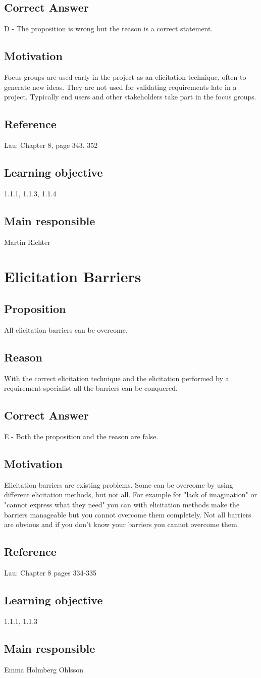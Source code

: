 \documentclass[a4paper]{article}
\begin{document}
\subsection*{Correct Answer}
D - The proposition is wrong but the reason is a correct statement.
\subsection*{Motivation}
Focus groups are used early in the project as an elicitation technique, often to generate new ideas. They are not used for validating requirements late in a project. Typically end users and other stakeholders take part in the focus groups.
\subsection*{Reference}
Lau: Chapter 8, page 343, 352
\subsection*{Learning objective}
1.1.1, 1.1.3, 1.1.4
\subsection*{Main responsible}
Martin Richter


\section{Elicitation Barriers}
\subsection*{Proposition}
All elicitation barriers can be overcome.
\subsection*{Reason}
With the correct elicitation technique and the elicitation performed by a requirement specialist all the barriers can be conquered.
\subsection*{Correct Answer}
E - Both the proposition and the reason are false.
\subsection*{Motivation}
Elicitation barriers are existing problems. Some can be overcome by using different elicitation methods, but not all. For example for "lack of imagination" or "cannot express what they need" you can with elicitation methods make the barriers manageable but you cannot overcome them completely. Not all barriers are obvious and if you don't know your barriers you cannot overcome them.
\subsection*{Reference}
Lau: Chapter 8 pages 334-335
\subsection*{Learning objective}
1.1.1, 1.1.3
\subsection*{Main responsible}
Emma Holmberg Ohlsson
\end{document}

